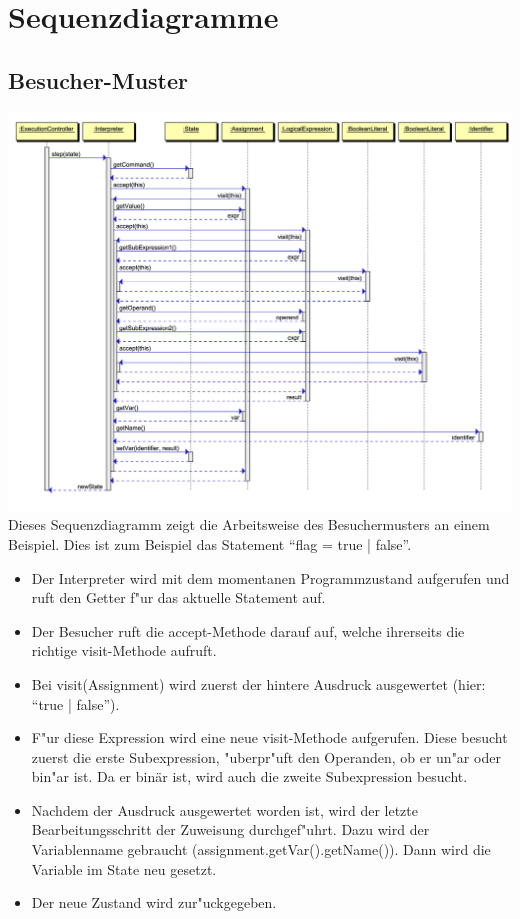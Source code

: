 \documentclass[10pt,a4paper,titlepage]{article}
\begin{document}
\section{Sequenzdiagramme}
\subsection{Besucher-Muster}
\includegraphics[scale=0.9]{images/visitor_pattern.pdf} \newline
Dieses Sequenzdiagramm zeigt die Arbeitsweise des Besuchermusters an einem Beispiel. Dies ist zum Beispiel das Statement "`flag = true | false"'.
\begin{itemize}
\item Der Interpreter wird mit dem momentanen Programmzustand aufgerufen und ruft den Getter f"ur das aktuelle Statement auf.
\item Der Besucher ruft die accept-Methode darauf auf, welche ihrerseits die richtige visit-Methode aufruft.
\item Bei visit(Assignment) wird zuerst der hintere Ausdruck ausgewertet (hier: "`true | false"').
\item F"ur diese Expression wird eine neue visit-Methode aufgerufen. Diese besucht zuerst die erste Subexpression, "uberpr"uft den Operanden, ob er un"ar oder bin"ar ist. Da er binär ist, wird auch die zweite Subexpression besucht.
\item Nachdem der Ausdruck ausgewertet worden ist, wird der letzte Bearbeitungsschritt der Zuweisung durchgef"uhrt. Dazu wird der Variablenname gebraucht (assignment.getVar().getName()). Dann wird die Variable im State neu gesetzt.
\item Der neue Zustand wird zur"uckgegeben.
\end{itemize}
\end{document}
